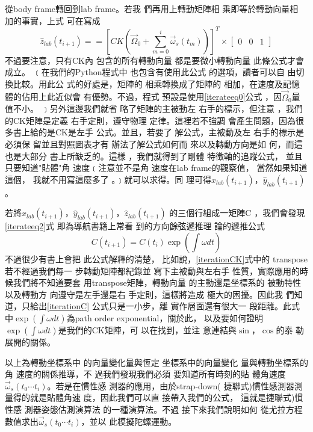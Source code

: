\documentclass{article}
\begin{document}
從body frame轉回到lab frame。若我%
們再用上轉動矩陣相%
乘即等於轉動向量相%
加的事實\cite{goldstein}，上式%
可在寫成%
\begin{equation}
\hat{z}_{lab}\left( t_{i+1}\right) ==\left[ CK\left( \vec{\Omega}%
_{0}+\sum\limits_{m=0}^{i}\vec{\omega}_{s}\left( t_{m}\right) \right) \right]
^{T}\times \left[ 
\begin{array}{ccc}
0 & 0 & 1%
\end{array}%
\right]  \label{iterateeq2}
\end{equation}%
不過要注意，只有CK內%
包含的所有轉動向量%
都是要微小轉動向量%
此條公式才會成立。%
﹝在我們的Python程式中%
也包含有使用此公式%
的選項，讀者可以自%
由切換比較。用此公%
式的好處是，矩陣的%
相乘轉換成了矩陣的%
相加，在速度及記憶%
體的佔用上此近似會%
有優勢。不過，程式%
預設是使用\ref{iterateeq0}公式%
，因$\vec{\Omega}_{0}$量值不小。%
﹞另外這邊我們就省%
略了矩陣的主被動左%
右手的標示，但注意%
，我們的CK矩陣是定義%
右手定則，遵守物理%
定律。這裡若不強調%
會產生問題，因為很%
多書上給的是CK是左手%
公式。並且，若要了%
解公式，主被動及左%
右手的標示是必須保%
留並且對照圖表才有%
辦法了解公式如何而%
來以及轉動方向是如%
何，而這也是大部分%
書上所缺乏的。這樣%
，我們就得到了剛體%
特徵軸的追蹤公式，%
並且只要知道"貼體"角%
速度﹝注意並不是角%
速度在lab frame的觀察值，%
當然如果知道這個，%
我就不用寫這麼多了%
。﹞就可以求得。同%
理可得$\hat{x}_{lab}\left( t_{i+1}\right) $，$\hat{y}%
_{lab}\left( t_{i+1}\right) $。

\bigskip 若將$\hat{x}_{lab}\left( t_{i+1}\right) $，$\hat{y%
}_{lab}\left( t_{i+1}\right) $，$\hat{z}_{lab}\left( t_{i+1}\right) $%
的三個行組成一矩陣C%
，我們會發現\ref{iterateeq2}式%
即為導航書籍上常看%
到的方向餘弦遞推理%
論的遞推公式\cite{titterton}%
\begin{equation}
C(t_{i+1})=C(t_{i})\exp (\int \omega dt)  \label{iterationC}
\end{equation}%
不過很少有書上會把%
此公式解釋的清楚，%
比如說，\ref{iterationCK}式中的%
transpose若不經過我們每一%
步轉動矩陣都紀錄並%
寫下主被動與左右手%
性質，實際應用的時%
候我們將不知道要套%
用transpose矩陣，轉動向量%
的主動還是坐標系的%
被動特性以及轉動方%
向遵守是左手還是右%
手定則，這樣將造成%
極大的困擾。因此我%
們知道，只給出\ref{iterationC}%
公式只是一小步，離%
實作層面還有很大一%
段距離。此式中$\exp (\int \omega
dt)$為path order exponential，關於此，%
以及要如何證明$\exp (\int \omega
dt)$是我們的CK矩陣，可%
以在\cite[Page 49]{tong}找到，並注%
意連結與$\sin $，$\cos $的泰%
勒展開的關係。

以上為轉動坐標系中%
的向量變化量與恆定%
坐標系中的向量變化%
量與轉動坐標系的角%
速度的關係推導，不%
過我們發現我們必須%
要知道所有時刻的貼%
體角速度$\vec{\omega}_{s}\left( t_{0}\cdots
t_{i}\right) $。若是在慣性感%
測器的應用，由於strap-down(%
捷聯式)慣性感測器測%
量得的就是貼體角速%
度，因此我們可以直%
接帶入我們的公式，%
這就是捷聯式)慣性感%
測器姿態估測演算法%
的一種演算法。不過%
接下來我們說明如何%
從尤拉方程數值求出$%
\vec{\omega}_{s}\left( t_{0}\cdots t_{i}\right) $，並以%
此模擬陀螺運動。
\end{document}
